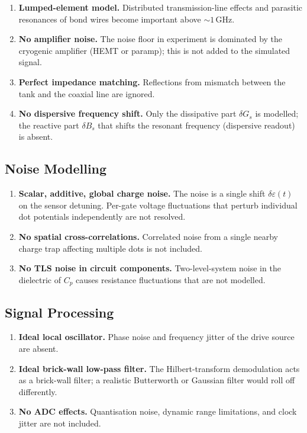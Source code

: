 \documentclass[11pt,a4paper]{article}
\begin{document}
\begin{enumerate}[label=\alph*.]
  \item \textbf{Lumped-element model.} Distributed transmission-line effects
    and parasitic resonances of bond wires become important above
    ${\sim}1$\,GHz.
  \item \textbf{No amplifier noise.} The noise floor in experiment is
    dominated by the cryogenic amplifier (HEMT or paramp); this is not added
    to the simulated signal.
  \item \textbf{Perfect impedance matching.} Reflections from mismatch between
    the tank and the coaxial line are ignored.
  \item \textbf{No dispersive frequency shift.} Only the dissipative part
    $\delta G_s$ is modelled; the reactive part $\delta B_s$ that shifts the
    resonant frequency (dispersive readout) is absent.
\end{enumerate}

\subsection{Noise Modelling}

\begin{enumerate}[label=\alph*.]
  \item \textbf{Scalar, additive, global charge noise.} The noise is a single
    shift $\delta\varepsilon(t)$ on the sensor detuning. Per-gate voltage
    fluctuations that perturb individual dot potentials independently are not
    resolved.
  \item \textbf{No spatial cross-correlations.} Correlated noise from a
    single nearby charge trap affecting multiple dots is not included.
  \item \textbf{No TLS noise in circuit components.} Two-level-system noise
    in the dielectric of $C_p$ causes resistance fluctuations that are not
    modelled.
\end{enumerate}

\subsection{Signal Processing}

\begin{enumerate}[label=\alph*.]
  \item \textbf{Ideal local oscillator.} Phase noise and frequency jitter of
    the drive source are absent.
  \item \textbf{Ideal brick-wall low-pass filter.} The Hilbert-transform
    demodulation acts as a brick-wall filter; a realistic Butterworth or
    Gaussian filter would roll off differently.
  \item \textbf{No ADC effects.} Quantisation noise, dynamic range
    limitations, and clock jitter are not included.
\end{enumerate}
\end{document}
